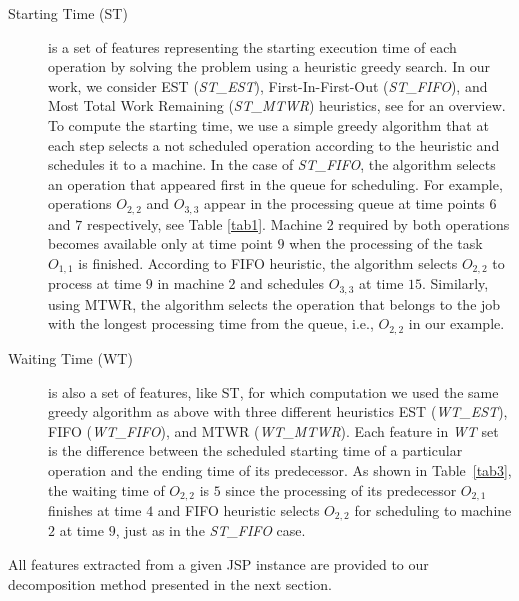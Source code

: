 \documentclass[runningheads]{llncs}
\newcommand{\stest}{\textit{ST\_EST}\xspace}
\newcommand{\stmtwr}{\textit{ST\_MTWR}\xspace}
\newcommand{\stfifo}{\textit{ST\_FIFO}\xspace}
\newcommand{\wtest}{\textit{WT\_EST}\xspace}
\newcommand{\wtmtwr}{\textit{WT\_MTWR}\xspace}
\newcommand{\wtfifo}{\textit{WT\_FIFO}\xspace}
\begin{document}
\begin{description}
  \item[Starting Time (ST)] is a set of features representing the starting execution time of each operation by solving the problem using a heuristic greedy search. In our work, we consider EST (\stest), First-In-First-Out (\stfifo), and Most Total Work Remaining (\stmtwr) heuristics, see \cite{jones1998survey} for an overview.
  To compute the starting time, we use a simple greedy algorithm \cite{el2020job} that at each step selects a not scheduled operation according to the heuristic and schedules it to a machine. In the case of \stfifo, the algorithm selects an operation that appeared first in the queue for scheduling. For example, operations $O_{2,2}$ and $O_{3,3}$ appear in the processing queue at time points $6$ and $7$ respectively, see Table \ref{tab1}. Machine 2 required by both operations becomes available only at time point $9$ when the processing of the task $O_{1,1}$ is finished. According to FIFO heuristic, the algorithm selects $O_{2,2}$ to process at time $9$ in machine $2$ and schedules $O_{3,3}$ at time $15$. Similarly, using MTWR, the algorithm selects the operation that belongs to the job with the longest processing time from the queue, i.e., $O_{2,2}$ in our example.

  \item[Waiting Time (WT)] is also a set of features, like ST, for which computation we used the same greedy algorithm as above with three different heuristics EST (\wtest), FIFO (\wtfifo), and MTWR (\wtmtwr). Each feature in \textit{WT} set is the difference between the scheduled starting time of a particular operation and the ending time of its predecessor.
  As shown in Table~\ref{tab3}, the waiting time of $O_{2,2}$ is $5$ since the processing of its predecessor $O_{2,1}$ finishes at time $4$ and FIFO heuristic selects $O_{2,2}$ for scheduling to machine $2$ at time $9$, just as in the \stfifo case.
\end{description}
%
All features extracted from a given JSP instance are provided to our decomposition method presented in the next section. 
\end{document}
